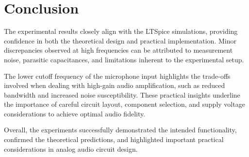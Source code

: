 \documentclass[12pt]{article}
\begin{document}
\section{Conclusion}
The experimental results closely align with the LTSpice simulations, providing confidence in both the theoretical design and practical implementation. Minor discrepancies observed at high frequencies can be attributed to measurement noise, parasitic capacitances, and limitations inherent to the experimental setup.

The lower cutoff frequency of the microphone input highlights the trade-offs involved when dealing with high-gain audio amplification, such as reduced bandwidth and increased noise susceptibility. These practical insights underline the importance of careful circuit layout, component selection, and supply voltage considerations to achieve optimal audio fidelity.

Overall, the experiments successfully demonstrated the intended functionality, confirmed the theoretical predictions, and highlighted important practical considerations in analog audio circuit design.
\end{document}
